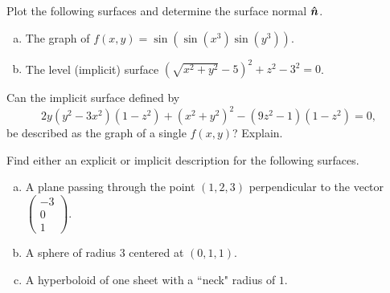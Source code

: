 \documentclass[12pt]{article} %
\begin{document}
\newpage
\begin{problem}
    Plot the following surfaces and determine the surface normal $\boldsymbol{\hat{n}}$.
\begin{enumerate}[(a)]
    \item The graph of $f(x,y)=\sin(\sin(x^3)\sin(y^3))$.
    \item The level (implicit) surface $\left(\sqrt{x^2+y^2}-5\right)^2 + z^2 - 3^2 = 0$.
\end{enumerate}
\end{problem}
\begin{solution}

\end{solution}

\newpage
\begin{problem}
    Can the implicit surface defined by
    \[
        2y(y^2-3x^2)(1-z^2)+(x^2+y^2)^2-(9z^2-1)(1-z^2)=0,
    \]
    be described as the graph of a single $f(x,y)$? Explain.
\end{problem}
\begin{solution}

\end{solution}

\newpage
\begin{problem}
    Find either an explicit or implicit description for the following surfaces. 
\begin{enumerate}[(a)]
    \item A plane passing through the point $(1,2,3)$ perpendicular to the vector $\begin{pmatrix} -3 \\ 0 \\ 1 \end{pmatrix}$.
    \item A sphere of radius 3 centered at $(0,1,1)$.
    \item A hyperboloid of one sheet with a ``neck" radius of $1$.
\end{enumerate}
\end{problem}
\begin{solution}

\end{solution}
\end{document}
